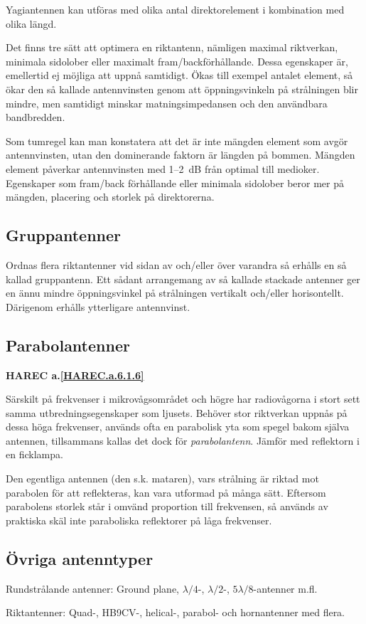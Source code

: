 Yagiantennen kan utföras med olika antal direktorelement i kombination med
olika längd.

Det finns tre sätt att optimera en riktantenn, nämligen maximal
riktverkan, minimala sidolober eller maximalt fram/backförhållande.
Dessa egenskaper är, emellertid ej möjliga att uppnå samtidigt.
Ökas till exempel antalet element, så ökar den så kallade antennvinsten genom
att öppningsvinkeln på strålningen blir mindre, men samtidigt minskar
matningsimpedansen och den användbara bandbredden.

Som tumregel kan man konstatera att det är inte mängden element som
avgör antennvinsten, utan den dominerande faktorn är längden på bommen.
Mängden element påverkar antennvinsten med 1--2~dB från optimal till
medioker.
Egenskaper som fram/back förhållande eller minimala sidolober beror mer
på mängden, placering och storlek på direktorerna.

\subsection{Gruppantenner}

Ordnas flera riktantenner vid sidan av och/eller över varandra så
erhålls en så kallad gruppantenn.
Ett sådant arrangemang av så kallade stackade antenner ger en ännu mindre
öppningsvinkel på strålningen vertikalt och/eller horisontellt.
Därigenom erhålls ytterligare antennvinst.

\subsection{Parabolantenner}
\textbf{
HAREC a.\ref{HAREC.a.6.1.6}\label{myHAREC.a.6.1.6}
}

Särskilt på frekvenser i mikrovågsområdet och högre har radiovågorna i
stort sett samma utbredningsegenskaper som ljusets.
Behöver stor riktverkan uppnås på dessa höga frekvenser, används ofta en
parabolisk yta som spegel bakom själva antennen, tillsammans kallas det dock
för \emph{parabolantenn}.
Jämför med reflektorn i en ficklampa.

Den egentliga antennen (den s.k. mataren), vars strålning är riktad
mot parabolen för att reflekteras, kan vara utformad på många sätt.
Eftersom parabolens storlek står i omvänd proportion till frekvensen, så
används av praktiska skäl inte paraboliska reflektorer på låga frekvenser.

\subsection{Övriga antenntyper}

Rundstrålande antenner: Ground plane, \(\lambda/4\)-, \(\lambda/2\)-,
\(5\lambda/8\)-antenner m.fl.

Riktantenner: Quad-, HB9CV-, helical-, parabol- och hornantenner med flera.
